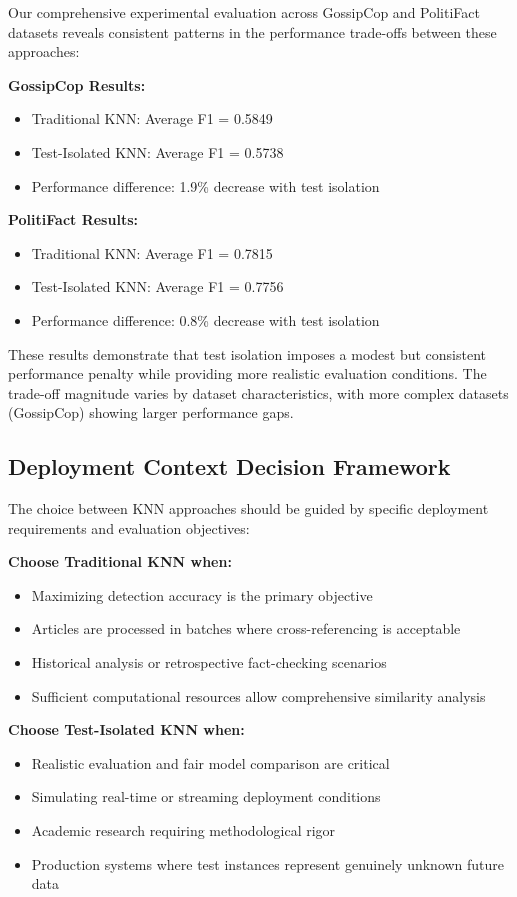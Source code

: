 Our comprehensive experimental evaluation across GossipCop and PolitiFact datasets reveals consistent patterns in the performance trade-offs between these approaches:

\textbf{GossipCop Results:}
\begin{itemize}
    \item Traditional KNN: Average F1 = 0.5849
    \item Test-Isolated KNN: Average F1 = 0.5738
    \item Performance difference: 1.9\% decrease with test isolation
\end{itemize}

\textbf{PolitiFact Results:}
\begin{itemize}
    \item Traditional KNN: Average F1 = 0.7815
    \item Test-Isolated KNN: Average F1 = 0.7756
    \item Performance difference: 0.8\% decrease with test isolation
\end{itemize}

These results demonstrate that test isolation imposes a modest but consistent performance penalty while providing more realistic evaluation conditions. The trade-off magnitude varies by dataset characteristics, with more complex datasets (GossipCop) showing larger performance gaps.

\subsection{Deployment Context Decision Framework}

The choice between KNN approaches should be guided by specific deployment requirements and evaluation objectives:

\textbf{Choose Traditional KNN when:}
\begin{itemize}
    \item Maximizing detection accuracy is the primary objective
    \item Articles are processed in batches where cross-referencing is acceptable
    \item Historical analysis or retrospective fact-checking scenarios
    \item Sufficient computational resources allow comprehensive similarity analysis
\end{itemize}

\textbf{Choose Test-Isolated KNN when:}
\begin{itemize}
    \item Realistic evaluation and fair model comparison are critical
    \item Simulating real-time or streaming deployment conditions
    \item Academic research requiring methodological rigor
    \item Production systems where test instances represent genuinely unknown future data
\end{itemize}

